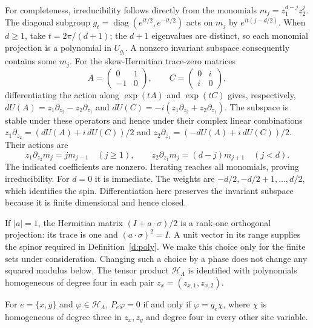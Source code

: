 For completeness, irreducibility follows directly from the monomials
\(m_j=z_1^{d-j}z_2^j\). The diagonal subgroup
\(g_t=\operatorname{diag}(e^{it/2},e^{-it/2})\) acts on \(m_j\)
by \(e^{it(j-d/2)}\). When \(d\ge1\), take
\(t=2\pi/(d+1)\); the \(d+1\) eigenvalues are distinct, so each
monomial projection is a polynomial in \(U_{g_t}\).
A nonzero invariant subspace consequently contains some \(m_j\).
For the skew-Hermitian trace-zero matrices
\[
 A=\begin{pmatrix}0&1\\-1&0\end{pmatrix},\qquad
 C=\begin{pmatrix}0&i\\i&0\end{pmatrix},
\]
differentiating the action along \(\exp(tA)\) and \(\exp(tC)\)
gives, respectively,
\(dU(A)=z_1\partial_{z_2}-z_2\partial_{z_1}\) and
\(dU(C)=-i(z_1\partial_{z_2}+z_2\partial_{z_1})\).
The subspace is stable under these operators and hence under their
complex linear combinations
\(z_1\partial_{z_2}=(dU(A)+i\,dU(C))/2\) and
\(z_2\partial_{z_1}=(-dU(A)+i\,dU(C))/2\).
Their actions are
\[
 z_1\partial_{z_2}m_j=j m_{j-1}\quad(j\ge1),\qquad
 z_2\partial_{z_1}m_j=(d-j)m_{j+1}\quad(j<d).
\]
The indicated coefficients are nonzero. Iterating reaches all
monomials, proving irreducibility. For \(d=0\) it is immediate.
The weights are \(-d/2,-d/2+1,\ldots,d/2\), which identifies the
spin. Differentiation here preserves the invariant subspace because
it is finite dimensional and hence closed.

If \(|a|=1\), the Hermitian matrix \((I+a\cdot\sigma)/2\) is a
rank-one orthogonal projection: its trace is one and
\((a\cdot\sigma)^2=I\). A unit vector in its range supplies the
spinor required in Definition~\ref{d:poly}. We make this choice only
for the finite sets under consideration. Changing such a choice by
a phase does not change any squared modulus below.
The tensor product \(\mathcal H_\Lambda\) is identified with
polynomials homogeneous of degree four in each pair
\(z_x=(z_{x,1},z_{x,2})\).

\begin{lemma}\label{l:edge}
For \(e=\{x,y\}\) and \(\varphi\in\mathcal H_\Lambda\),
\(P_e\varphi=0\) if and only if
\(\varphi=q_e\chi\), where \(\chi\) is homogeneous of degree three
in \(z_x,z_y\) and degree four in every other site variable.
\end{lemma}

